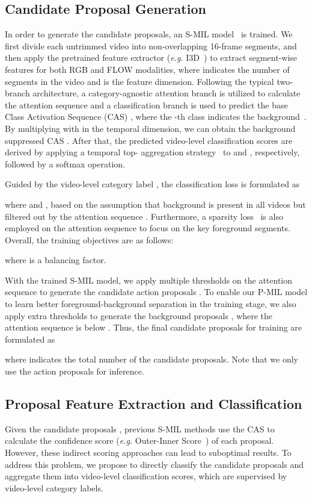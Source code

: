 \subsection{Candidate Proposal Generation}
\label{sec:proposal-generation}
In order to generate the candidate proposals,
an S-MIL model~\cite{mm2021CO2Net} is trained.
We first divide each untrimmed video into non-overlapping 16-frame segments,
and then apply the pretrained feature extractor (\emph{e.g.} I3D~\cite{cvpr2017i3d}) to extract segment-wise features  for both RGB and FLOW modalities,
where  indicates the number of segments in the video and  is the feature dimension.
Following the typical two-branch architecture,
a category-agnostic attention branch is utilized to calculate the attention sequence 
and a classification branch is used to predict the base Class Activation Sequence (CAS) ,
where the -th class indicates the background~\cite{aaai2020background,iccv2019backgroundmodel}.
By multiplying  with  in the temporal dimension,
we can obtain the background suppressed CAS .
After that, the predicted video-level classification scores 
are derived by applying a temporal top- aggregation strategy~\cite{aaai2020background,aaai2021HAMNet,cvpr2022asmloc} to  and , respectively,
followed by a softmax operation.




Guided by the video-level category label , the classification loss is formulated as

where  and , based on the assumption that background is present in all videos but filtered out by the attention sequence .
Furthermore, a sparsity loss~\cite{cvpr2018stpn} 
is also employed on the attention sequence  to focus on the key foreground segments.
Overall, the training objectives are as follows:

where  is a balancing factor.


With the trained S-MIL model,
we apply multiple thresholds  on the attention sequence  to generate the candidate action proposals .
To enable our P-MIL model to learn better foreground-background separation in the training stage,
we also apply extra thresholds  to generate the background proposals ,
where the attention sequence  is below .
Thus, the final candidate proposals for training are formulated as

where  indicates the total number of the candidate proposals.
Note that we only use the action proposals  for inference.



\subsection{Proposal Feature Extraction and Classification}
\label{sec:proposal-based}
Given the candidate proposals ,
previous S-MIL methods use the CAS to calculate the confidence score (\emph{e.g.} Outer-Inner Score~\cite{eccv2018autoloc}) of each proposal.
However, these indirect scoring approaches can lead to suboptimal results.
To address this problem, we propose to directly classify the candidate proposals
and aggregate them into video-level classification scores,
which are supervised by video-level category labels.



